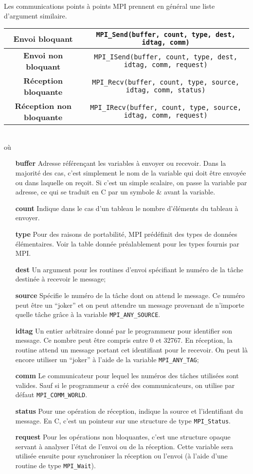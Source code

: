 \documentclass[11pt,a4paper]{article}
\begin{document}
Les communications points à points MPI prennent en général une liste d'argument similaire.\\
{\small
\begin{tabular}{|c|c|}\hline
\textbf{Envoi bloquant} & \texttt{MPI\_Send(buffer, count, type, dest, idtag, comm)} \\ \hline
\textbf{Envoi non bloquant} & \texttt{MPI\_ISend(buffer, count, type, dest, idtag, comm, request)} \\ \hline
\textbf{Réception bloquante} & \texttt{MPI\_Recv(buffer, count, type, source, idtag, comm, status)} \\ \hline
\textbf{Réception non bloquante} & \texttt{MPI\_IRecv(buffer, count, type, source, idtag, comm, request)} \\ \hline
\end{tabular}
}\\
où
\begin{itemize}
\item[{\bf buffer}] Adresse référençant les variables à envoyer ou recevoir. Dans la majorité des cas, c'est simplement le nom
de la variable qui doit être envoyée ou dans laquelle on reçoit. Si c'est un simple scalaire, on passe la variable par adresse,
ce qui se traduit en C par un symbole \& avant la variable.
\item[{\bf count}] Indique dans le cas d'un tableau le nombre d'éléments du tableau à envoyer.
\item[{\bf type}]  Pour des raisons de portabilité, MPI prédéfinit des types de données élémentaires. Voir la table donnée préalablement
pour les types fournis par MPI.
\item[{\bf dest}] Un argument pour les routines d'envoi spécifiant le numéro de la tâche destinée à recevoir le message;
\item[{\bf source}] Spécifie le numéro de la tâche dont on attend le message. Ce numéro peut être un ``joker'' et on peut attendre un message
provenant de n'importe quelle tâche grâce à la variable \texttt{MPI\_ANY\_SOURCE}.
\item[{\bf idtag}] Un entier arbitraire donné par le programmeur pour identifier son message. Ce nombre peut être compris entre 0
et 32767. En réception, la routine attend un message portant cet identifiant pour le recevoir. On peut là encore utiliser un ``joker''
à l'aide de la variable \texttt{MPI\_ANY\_TAG};
\item[{\bf comm}] Le communicateur pour lequel les numéros des tâches utilisées sont valides. Sauf si le programmeur a créé des communicateurs,
on utilise par défaut \texttt{MPI\_COMM\_WORLD}.
\item[{\bf status}] Pour une opération de réception, indique la source et l'identifiant du message. En C, c'est un pointeur sur une structure
de type \texttt{MPI\_Status}. 
\item[{\bf request}] Pour les opérations non bloquantes, c'est une structure opaque servant à analyser l'état de l'envoi ou de la réception.
Cette variable sera utilisée ensuite pour synchroniser la réception ou l'envoi (à l'aide d'une routine de type \texttt{MPI\_Wait}).
\end{itemize}
\end{document}
